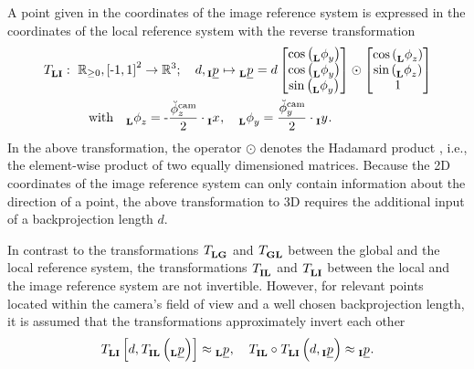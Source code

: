 A point given in the coordinates of the image reference system is expressed
in the coordinates of the local reference system with the reverse transformation
\begin{align} \label{eq:image_to_local_transformation}
    \trafo[]{}{\lrs\irs}{}{}
    &:\ 
    \mathbb{R}_{\ge 0}, \left[ \text{-}1, 1 \right]^2 \rightarrow \mathbb{R}^3
    ; \quad
    d, \pos[]{}{}{\irs}{} \mapsto \pos[]{}{}{\lrs}{}
    =
    d \begin{bmatrix}
        \cos \left( \ang[]{}{y}{\lrs}{} \right) \\
        \cos \left( \ang[]{}{y}{\lrs}{} \right) \\
        \sin \left( \ang[]{}{y}{\lrs}{} \right)
    \end{bmatrix} \odot \begin{bmatrix}
        \cos \left( \ang[]{}{z}{\lrs}{} \right) \\
        \sin \left( \ang[]{}{z}{\lrs}{} \right) \\
        1
    \end{bmatrix}
    \nonumber \\
    & \qquad \text{with} \quad
    \ang[]{}{z}{\lrs}{}
    = 
    \text - \frac{\ang[\user]{\camera}{z}{}{}}{2} \cdot \x[]{}{}{\irs}{}
    ,\quad 
    \ang[]{}{y}{\lrs}{}
    = 
    \frac{\ang[\user]{\camera}{y}{}{}}{2} \cdot \y[]{}{}{\irs}{}.
\end{align}
In the above transformation,
the operator 
$\odot$ 
denotes the Hadamard product
, i.e., the element-wise product of two equally dimensioned matrices.
Because the 2D coordinates of the image reference system
can only contain information about the direction of a point,
the above transformation to 3D requires the additional input of a backprojection length $d$.

In contrast to the transformations 
$\trafo[]{}{\lrs\grs}{}{}$
and 
$\trafo[]{}{\grs\lrs}{}{}$
between the global and the local reference system,
the transformations 
$\trafo[]{}{\irs\lrs}{}{}$
and 
$\trafo[]{}{\lrs\irs}{}{}$
between the local and the image reference system
are not invertible.
However, for relevant points
located within the camera's field of view
and a well chosen backprojection length,
it is assumed that the transformations approximately invert each other
\begin{equation}
    \trafo[]{}{\lrs\irs}{}{} \left[
        d, \trafo[]{}{\irs\lrs}{}{} \left( \pos[]{}{}{\lrs}{} \right)
    \right]
    \approx
    \pos[]{}{}{\lrs}{}
    ,\quad
    \trafo[]{}{\irs\lrs}{}{}
    \circ 
    \trafo[]{}{\lrs\irs}{}{} \left(
        d, \pos[]{}{}{\irs}{}
    \right)
    \approx
    \pos[]{}{}{\irs}{}.
\end{equation}





